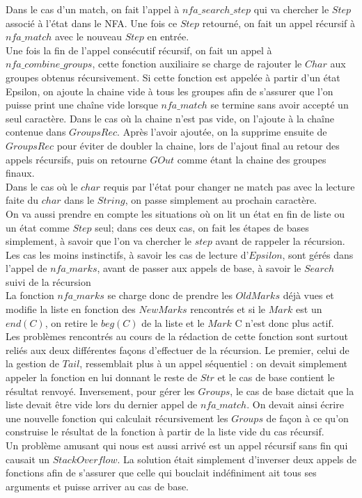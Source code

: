 \documentclass{article}
\begin{document}
        Dans le cas d'un match, on fait l'appel à $nfa\_search\_step$ qui va chercher le 
        $Step$ associé à l'état dans le NFA. Une fois ce $Step$ retourné, on fait un appel récursif à 
        $nfa\_match$ avec le nouveau $Step$ en entrée. \\
        Une fois la fin de l'appel consécutif récursif, on fait un appel à $nfa\_combine\_groups$, cette 
        fonction auxiliaire se charge de rajouter le $Char$ aux groupes obtenus récursivement. Si 
        cette fonction est appelée à partir d'un état Epsilon, on ajoute la chaine vide à tous les groupes
        afin de s'assurer que l'on puisse print une chaîne vide lorsque $nfa\_match$ se termine sans avoir 
        accepté un seul caractère. Dans le cas où la chaine n'est pas vide, on l'ajoute à la chaîne contenue dans $GroupsRec$. 
        Après l'avoir ajoutée, on la supprime ensuite de $GroupsRec$ pour éviter de doubler la chaine, lors de l'ajout final 
        au retour des appels récursifs, puis on retourne $GOut$ comme étant la chaine des groupes finaux.\\
        Dans le cas où le $char$ requis par l'état pour changer ne match pas avec la lecture faite 
        du $char$ dans le $String$, on passe simplement au prochain caractère. \\
        On va aussi prendre en compte les situations où on lit un état en fin de liste ou un état comme $Step$ 
        seul; dans ces deux cas, on fait les étapes de bases simplement, à savoir que l'on va chercher le $step$ 
        avant de rappeler la récursion.\\
        Les cas les moins instinctifs, à savoir les cas de lecture d'$Epsilon$, sont gérés dans l'appel de $nfa\_marks$, 
        avant de passer aux appels de base, à savoir le $Search$ suivi de la récursion\\
        La fonction $nfa\_marks$ se charge donc de prendre les $OldMarks$ déjà vues et modifie la liste en fonction des 
        $NewMarks$ rencontrés et si le $Mark$ est un $end(C)$, on retire le $beg(C)$ de la liste et le $Mark$ C n'est 
        donc plus actif.\\
        Les problèmes rencontrés au cours de la rédaction de cette fonction sont surtout reliés aux deux différentes façons
        d'effectuer de la récursion. Le premier, celui de la gestion de $Tail$, ressemblait plus à un appel séquentiel : 
        on devait simplement appeler la fonction en lui donnant le reste de $Str$ et le cas de base contient le résultat renvoyé.
        Inversement, pour gérer les $Groups$, le cas de base dictait que la liste devait être vide 
        lors du dernier appel de $nfa\_match$. On devait ainsi écrire une nouvelle fonction qui calculait récursivement les $Groups$
        de façon à ce qu'on construise le résultat de la fonction à partir de la liste vide du cas récursif.\\
        Un problème amusant qui nous est aussi arrivé est un appel récursif sans fin qui causait un $Stack Overflow$. 
        La solution était simplement d'inverser deux appels de fonctions afin de s'assurer que celle qui bouclait indéfiniment
        ait tous ses arguments et puisse arriver au cas de base.
\end{document}
